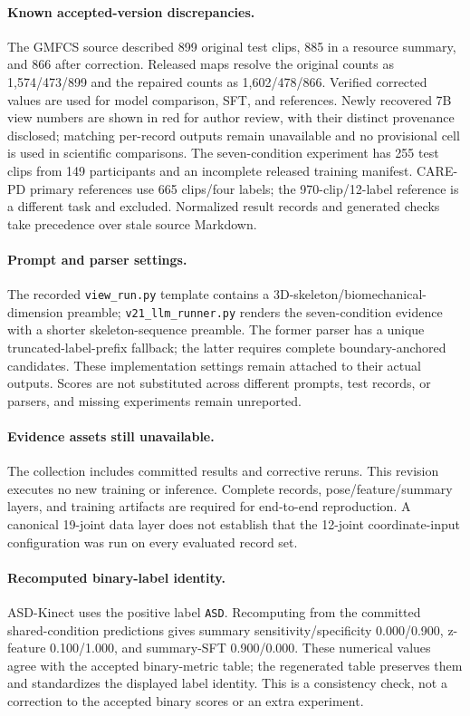 \paragraph{Known accepted-version discrepancies.}
The GMFCS source described 899 original test clips, 885 in a resource summary, and 866 after correction. Released maps resolve the original counts as 1,574/473/899 and the repaired counts as 1,602/478/866. Verified corrected values are used for model comparison, SFT, and references. Newly recovered 7B view numbers are shown in red for author review, with their distinct provenance disclosed; matching per-record outputs remain unavailable and no provisional cell is used in scientific comparisons. The seven-condition experiment has 255 test clips from 149 participants and an incomplete released training manifest. CARE-PD primary references use 665 clips/four labels; the 970-clip/12-label reference is a different task and excluded. Normalized result records and generated checks take precedence over stale source Markdown.

\paragraph{Prompt and parser settings.}
The recorded \texttt{view\_run.py} template contains a 3D-skeleton/biomechanical-dimension preamble; \texttt{v21\_llm\_runner.py} renders the seven-condition evidence with a shorter skeleton-sequence preamble. The former parser has a unique truncated-label-prefix fallback; the latter requires complete boundary-anchored candidates. These implementation settings remain attached to their actual outputs. Scores are not substituted across different prompts, test records, or parsers, and missing experiments remain unreported.

\paragraph{Evidence assets still unavailable.}
The collection includes committed results and corrective reruns. This revision executes no new training or inference. Complete records, pose/feature/summary layers, and training artifacts are required for end-to-end reproduction. A canonical 19-joint data layer does not establish that the 12-joint coordinate-input configuration was run on every evaluated record set.

\paragraph{Recomputed binary-label identity.}
ASD-Kinect uses the positive label \texttt{ASD}. Recomputing from the committed shared-condition predictions gives summary sensitivity/specificity 0.000/0.900, z-feature 0.100/1.000, and summary-SFT 0.900/0.000. These numerical values agree with the accepted binary-metric table; the regenerated table preserves them and standardizes the displayed label identity. This is a consistency check, not a correction to the accepted binary scores or an extra experiment.

